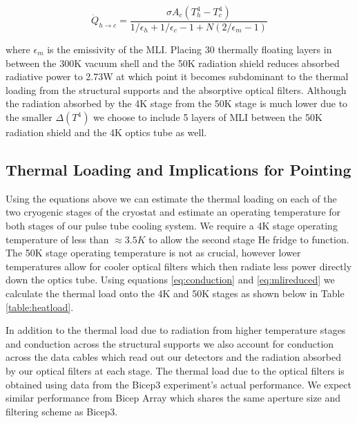 \documentclass[12pt]{article}
\begin{document}
\begin{equation}
	\dot{Q}_{h\rightarrow c}=\frac{\sigma A_c (T_h^4 - T_c ^4)}{1/\epsilon _h
	+ 1/\epsilon _c -1 + N(2/\epsilon _m -1)}
	\label{eq:mlireduced}
\end{equation}

where $\epsilon _m$ is the emissivity of the MLI. Placing 30 thermally
floating layers in between the 300K vacuum shell and the 50K radiation shield
reduces absorbed radiative power to 2.73W at which point it becomes
subdominant to the thermal loading from the structural supports and the
absorptive optical filters. Although the radiation absorbed by the 4K stage
from the 50K stage is much lower due to the smaller $\Delta (T^4)$ we choose
to include 5 layers of MLI between the 50K radiation shield and the 4K optics
tube as well.


\subsection{Thermal Loading and Implications for Pointing}
Using the equations above we can estimate the thermal loading on each of the
two cryogenic stages of the cryostat and estimate an operating temperature for both
stages of our pulse tube cooling system. We require a 4K stage operating
temperature of less than $\approx 3.5K$ to allow the second stage He fridge to
function. The 50K stage operating temperature is not as crucial, however lower
temperatures allow for cooler optical filters which then radiate less power
directly down the optics tube. Using equations \ref{eq:conduction} and
\ref{eq:mlireduced} we calculate the thermal load onto the 4K and 50K stages
as shown below in Table \ref{table:heatload}.

In addition to the thermal load due to radiation from higher temperature
stages and conduction across the structural supports we also account for
conduction across the data cables which read out our detectors and the
radiation absorbed by our optical filters at each stage. The thermal load due
to the optical filters is obtained using data from the Bicep3 experiment's
actual performance. We expect similar performance from Bicep Array which
shares the same aperture size and filtering scheme as Bicep3.
\end{document}
